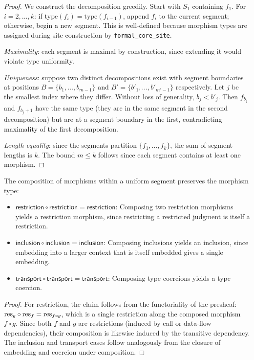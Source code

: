 \documentclass[11pt]{article}
\newcommand{\FormalSite}{\texttt{formal\_core\_site}}
\begin{document}
\begin{proof}
We construct the decomposition greedily.  Start with $S_1$ containing $f_1$.
For $i = 2, \ldots, k$: if $\mathrm{type}(f_i) = \mathrm{type}(f_{i-1})$,
append $f_i$ to the current segment; otherwise, begin a new segment.  This
is well-defined because morphism types are assigned during site construction
by \FormalSite.

\emph{Maximality}: each segment is maximal by construction, since extending
it would violate type uniformity.

\emph{Uniqueness}: suppose two distinct decompositions exist with segment
boundaries at positions $B = \{b_1, \ldots, b_{m-1}\}$ and
$B' = \{b'_1, \ldots, b'_{m'-1}\}$ respectively.  Let $j$ be the smallest
index where they differ.  Without loss of generality, $b_j < b'_j$.  Then
$f_{b_j}$ and $f_{b_j+1}$ have the same type (they are in the same segment
in the second decomposition) but are at a segment boundary in the first,
contradicting maximality of the first decomposition.

\emph{Length equality}: since the segments partition $\{f_1, \ldots, f_k\}$,
the sum of segment lengths is $k$.  The bound $m \leq k$ follows since each
segment contains at least one morphism.
\end{proof}

\begin{lemma}\label{lem:comp-preserves}
The composition of morphisms within a uniform segment preserves the morphism
type:
\begin{itemize}[noitemsep]
  \item $\mathsf{restriction} \circ \mathsf{restriction} = \mathsf{restriction}$:
    Composing two restriction morphisms yields a restriction morphism,
    since restricting a restricted judgment is itself a restriction.
  \item $\mathsf{inclusion} \circ \mathsf{inclusion} = \mathsf{inclusion}$:
    Composing inclusions yields an inclusion, since embedding into a
    larger context that is itself embedded gives a single embedding.
  \item $\mathsf{transport} \circ \mathsf{transport} = \mathsf{transport}$:
    Composing type coercions yields a type coercion.
\end{itemize}
\end{lemma}

\begin{proof}
For restriction, the claim follows from the functoriality of the presheaf:
$\mathrm{res}_g \circ \mathrm{res}_f = \mathrm{res}_{f \circ g}$, which is a single restriction
along the composed morphism $f \circ g$.  Since both $f$ and $g$ are
restrictions (induced by call or data-flow dependencies), their composition
is likewise induced by the transitive dependency.  The inclusion and
transport cases follow analogously from the closure of embedding and
coercion under composition.
\end{proof}
\end{document}
